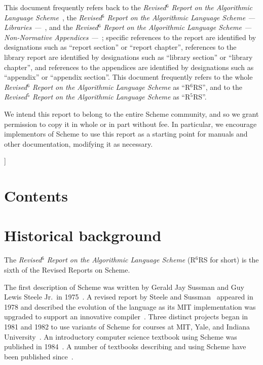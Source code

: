 \documentclass[twoside,twocolumn]{algol60}
\newcommand{\rn}[1]{R$^{#1}$RS}
\begin{document}
{{This document frequently refers back to the \textit{Revised\itspace{}$^6$ Report
  on the Algorithmic Language Scheme}~\cite{R6RS}, the
\textit{Revised\itspace{}$^6$ Report on the Algorithmic Language Scheme ---
  Libraries ---}~\cite{R6RS-libraries}, and the \textit{Revised\itspace{}$^6$
  Report on the Algorithmic Language Scheme --- Non-Normative
  Appendices ---}~\cite{R6RS-appendices}; specific references to the
report are identified by designations such as ``report section'' or
``report chapter'', references to the library report are identified by
designations such as ``library section'' or ``library chapter'', and
references to the appendices are identified by designations such as
``appendix'' or ``appendix section''.  This document frequently refers
to the whole \textit{Revised\itspace{}$^6$ Report on the Algorithmic Language
  Scheme} as ``\rn{6}'', and to the \textit{Revised\itspace{}$^5$ Report
  on the Algorithmic Language Scheme} as ``\rn{5}''.
}

\medskip

We intend this report to belong to the entire Scheme community, and so
we grant permission to copy it in whole or in part without fee.  In
particular, we encourage implementors of Scheme to use this report as
a starting point for manuals and other documentation, modifying it as
necessary.
}]

\texonly\clearpage\endtexonly

\chapter*{Contents}
\addvspace{3.5pt}                  %
\renewcommand{\tocshrink}{-4.0pt}  %
{%
\tableofcontents
}

\vfill

\texonly\clearpage\endtexonly


\chapter{Historical background}

The \textit{Revised\itspace{}$^6$ Report on the Algorithmic Language Scheme}
(\rn{6} for short) is the sixth of the Revised Reports on Scheme.

\vest The first description of Scheme was written by Gerald Jay
Sussman and Guy Lewis Steele Jr.\ in
1975~\cite{Scheme75}.  A revised report by Steele and
Sussman~\cite{Scheme78}
appeared in 1978 and described the evolution
of the language as its MIT implementation was upgraded to support an
innovative compiler~\cite{Rabbit}.  Three distinct projects began in
1981 and 1982 to use variants of Scheme for courses at MIT, Yale, and
Indiana University~\cite{Rees82,MITScheme,Scheme311}\nocite{Scheme84}.  An introductory
computer science textbook using Scheme was published in
1984~\cite{SICP}.  A number of textbooks describing and using Scheme
have been published since~\cite{tspl3}.
\end{document}
